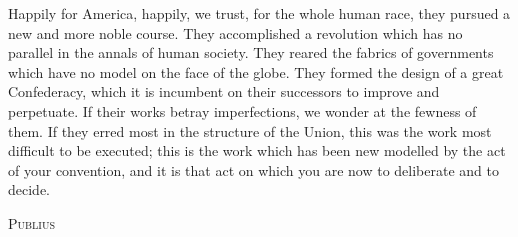 Happily for America, happily, we trust, for the whole human race, they pursued a new and more noble course. 
They accomplished a revolution which has no parallel in the annals of human society. 
They reared the fabrics of governments which have no model on the face of the globe. 
They formed the design of a great Confederacy, which it is incumbent on their successors to improve and perpetuate. 
If their works betray imperfections, we wonder at the fewness of them. 
If they erred most in the structure of the Union, this was the work most difficult to be executed; this is the work which has been new modelled by the act of your convention, and it is that act on which you are now to deliberate and to decide.

\vspace{.5cm}
\textsc{Publius}

\vspace{1.5cm}

